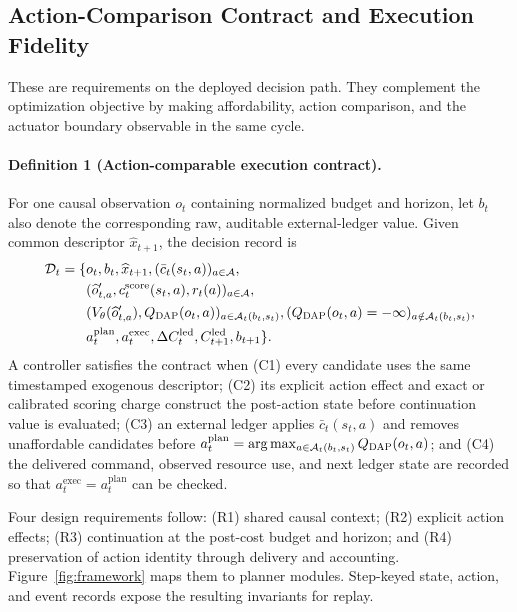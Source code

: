 \documentclass[acmsmall,screen,review,anonymous]{acmart}
\newcommand{\method}{\textsc{DAP}\xspace}
\begin{document}
\subsection{Action-Comparison Contract and Execution Fidelity}
\label{sec:requirements}

These are requirements on the deployed decision path.  They complement the
optimization objective by making affordability, action comparison, and the
actuator boundary observable in the same cycle.

\paragraph{Definition 1 (Action-comparable execution contract).}
For one causal observation \(o_t\) containing normalized budget and horizon,
let \(b_t\) also denote the corresponding raw, auditable external-ledger value.
Given common descriptor \(\widehat x_{t+1}\), the decision record is
\begin{equation}
 \begin{aligned}
 \mathcal D_t=\{&o_t,b_t,\widehat x_{t+1},
   (\bar c_t(s_t,a))_{a\in\mathcal A},\\
 & (\widehat o'_{t,a},c_t^{\mathrm{score}}(s_t,a),r_t(a))
   _{a\in\mathcal A},\\
 & (V_\theta(\widehat o'_{t,a}),Q_{\method}(o_t,a))
   _{a\in\mathcal A_t(b_t,s_t)},
   (Q_{\method}(o_t,a)=-\infty)_{a\notin\mathcal A_t(b_t,s_t)},\\
 & a_t^{\mathrm{plan}},a_t^{\mathrm{exec}},
   \Delta C_t^{\mathrm{led}},C_{t+1}^{\mathrm{led}},b_{t+1}\}.
 \end{aligned}
\end{equation}
A controller satisfies the contract when (C1) every candidate uses the same
timestamped exogenous descriptor; (C2) its explicit action effect and exact
or calibrated scoring charge construct the post-action state before
continuation value is evaluated; (C3) an external ledger applies
\(\bar c_t(s_t,a)\) and removes unaffordable candidates before
\(a_t^{\mathrm{plan}}=\arg\max_{a\in\mathcal A_t(b_t,s_t)}
Q_{\method}(o_t,a)\); and (C4) the
delivered command, observed resource use, and next ledger state are recorded so
that \(a_t^{\mathrm{exec}}=a_t^{\mathrm{plan}}\) can be checked.

Four design requirements follow: (R1) shared causal context; (R2) explicit
action effects; (R3) continuation at the post-cost budget and horizon; and
(R4) preservation of action identity through delivery and accounting.
Figure~\ref{fig:framework} maps them to planner modules. Step-keyed state,
action, and event records expose the resulting invariants for replay.
\end{document}
